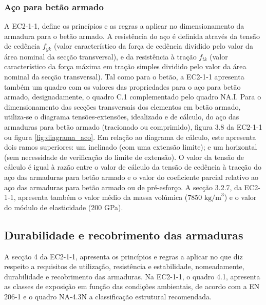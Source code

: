 \subsubsection{Aço para betão armado}
A EC2-1-1, define os princípios e as regras a aplicar no dimensionamento da armadura para o betão armado. A resistência do aço é definida através da tensão de cedência $f_{yk}$ (valor característico da força de cedência dividido pelo valor da área nominal da secção transversal), e da resistência à tração $f_{tk}$ (valor característico da força máxima em tração simples dividido pelo valor da área nominal da secção transversal). Tal como para o betão, a EC2-1-1 apresenta também um quadro com os valores das propriedades para o aço para betão armado, designadamente, o quadro C.1 complementado pelo quadro NA.I. Para o dimensionamento das secções transversais dos elementos em betão armado, utiliza-se o diagrama tensões-extensões, idealizado e de cálculo, do aço das armaduras para betão armado (tracionado ou comprimido), figura 3.8 da EC2-1-1 ou figura \ref{fig:diagrama_aco}. Em relação ao diagrama de cálculo, este apresenta dois ramos superiores: um inclinado (com uma extensão limite); e um horizontal (sem necessidade de verificação do limite de extensão). O valor da tensão de cálculo é igual à razão entre o valor de cálculo da tensão de cedência à tracção do aço das armaduras para betão armado e o valor do coeficiente parcial relativo ao aço das armaduras para betão armado ou de pré-esforço. A secção 3.2.7, da EC2-1-1, apresenta também o valor médio da massa volúmica ($7850 \text{ kg/m}^3$) e o valor do módulo de elasticidade (200 GPa).

\subsection{Durabilidade e recobrimento das armaduras}
A secção 4 da EC2-1-1, apresenta os princípios e regras a aplicar no que diz respeito a requisitos de utilização, resistência e estabilidade, nomeadamente, durabilidade e recobrimento das armaduras. Na EC2-1-1, o quadro 4.1, apresenta as classes de exposição em função das condições ambientais, de acordo com a EN 206-1 e o quadro NA-4.3N a classificação estrutural recomendada. 

